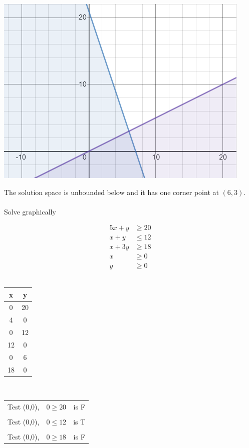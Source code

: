 \documentclass[14pt]{extarticle}
\begin{document}
\begin{center}
\includegraphics[width=0.9\linewidth]{5-2-1c}
\end{center}
The solution space is unbounded below and it has one corner point at $(6,3)$.
\\\\
Solve graphically \\
\begin{multicols}{3}
	\begin{align*}
		5x + y &\geq 20 \\
		x+y &\leq 12 \\
		x+ 3y &\geq 18 \\
		x &\geq 0 \\
		y &\geq 0
	\end{align*}
	\vspace{1.0cm}
	\\ 
	\begin{tabular}{c|c}
		x & y \\ \hline
		0 & 20 \\
		4 & 0 \\ \hline
		0 & 12 \\
		12 & 0 \\ \hline
		0 & 6 \\
		18 & 0
	\end{tabular}
	\\
	\begin{tabular}{ccc}
		Test (0,0), & $0 \geq 20$ & is F \\ & & \\
		Test (0,0), & $0 \leq 12$ & is T \\ & & \\
		Test (0,0), & $0 \geq 18$ & is F
	\end{tabular}
\end{multicols}
\end{document}
